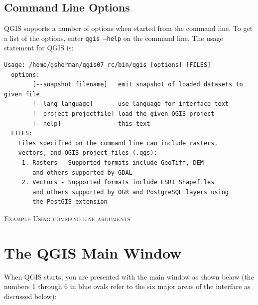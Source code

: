\subsection{Command Line Options}
QGIS supports a number of options when started from the command line. To get a
list of the options, enter \texttt{qgis ---help} on the command line. The usage
statement for QGIS is:
\small
\begin{verbatim}
Usage: /home/gsherman/qgis07_rc/bin/qgis [options] [FILES]
  options:
        [--snapshot filename]   emit snapshot of loaded datasets to given file
        [--lang language]       use language for interface text
        [--project projectfile] load the given QGIS project
        [--help]                this text
  FILES:
    Files specified on the command line can include rasters,
    vectors, and QGIS project files (.qgs):
     1. Rasters - Supported formats include GeoTiff, DEM
        and others supported by GDAL
     2. Vectors - Supported formats include ESRI Shapefiles
        and others supported by OGR and PostgreSQL layers using
        the PostGIS extension

\end{verbatim}
\normalsize
\begin{Tip} \caption{\textsc{Example Using command line arguments}}
\end{Tip}

\section{The QGIS Main Window}
When QGIS starts, you are presented with the main window as shown below (the
numbers 1 through 6 in blue ovals refer to the six major areas of the
interface as discussed below):

